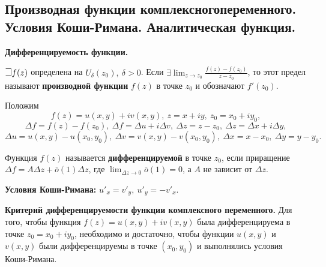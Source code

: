 \subsection{Производная функции комплексногопеременного. Условия Коши-Римана. Аналитическая  функция.}

\textbf{Дифференцируемость функции.}

$\mathLet f(z)$ определена на $U_{\delta}(z_0),~\delta > 0$. Если $\exists \displaystyle\lim_{z\to z_0} \frac{f(z) - f(z_0)}{z - z_0}$,
то этот предел называют \textbf{производной функции} $f(z)$ в точке $z_0$ и обозначают $f'(z_0)$.

Положим $$f(z) = u(x, y) + iv(x, y),~z = x + iy,~z_0 = x_0 + iy_0,$$
$$\Delta f = f(z)-f(z_0),~\Delta f = \Delta u + i\Delta v,~\Delta z = z- z_0,~\Delta z = \Delta x + i\Delta y,$$
$$\Delta u = u(x, y)-u(x_0, y_0),~\Delta v = v(x, y)-v(x_0, y_0),~\Delta x = x-x_0,~\Delta y = y- y_0.$$

Функция $f(z)$ называется \textbf{дифференцируемой} в точке $z_0$, если приращение $\Delta f = A\Delta z + \overline{o}(1)\Delta z$, где $\displaystyle\lim_{\Delta z\to0} \overline{o}(1) = 0$, а $A$ не зависит от $\Delta z$.

\textbf{Условия Коши-Римана:}
$u'_x = v'_y,~u'_y = -v'_x.$

\textbf{Критерий дифференцируемости функции комплексного переменного.}
Для того, чтобы функция $f(z) = u(x,y)+iv(x,y)$ была дифференцируема в точке $z_0 =x_0+iy_0$, необходимо и достаточно, чтобы функции $u(x,y)$ и $v(x,y)$ были дифференцируемы в точке $(x_0, y_0)$ и выполнялись условия Коши-Римана.

